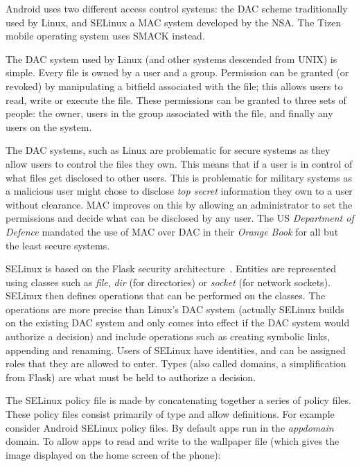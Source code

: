 \documentclass[a4paper,sfsidenotes]{%
  scrartcl%
}
\begin{document}
Android uses two different access control systems: the
\ac{DAC} scheme traditionally used by Linux, and SELinux a \ac{MAC} system
developed by the NSA.  The Tizen mobile
operating system uses SMACK instead.

The \ac{DAC} system used by Linux (and other systems descended from UNIX) is
simple.  Every file is owned by a user and a group.  Permission can be granted
(or revoked) by manipulating a bitfield associated with the file; this allows
users to read, write or execute the file.  These permissions can be granted to
three sets of people: the owner, users in the group associated with the file,
and finally any users on the system.

The \ac{DAC} systems, such as Linux are problematic for secure systems as they
allow users to control the files they own.  This means that if a user is in
control of what files get disclosed to other users.  This is problematic for
military systems as a malicious user might chose to disclose \emph{top secret}
information they own to a user without clearance.  \ac{MAC} improves on this by
allowing an administrator to set the permissions and decide what can be
disclosed by any user.  The US \emph{Department of Defence} mandated the use of
\ac{MAC} over \ac{DAC} in their \emph{Orange Book}\cite{LiliQiu:1985wq} for all but
the least secure systems.

SELinux is based on the Flask security architecture~\cite{Spencer:1999vm}.
Entities are represented using classes such as \emph{file}, \emph{dir} (for
directories) or \emph{socket} (for network sockets).  SELinux then defines
operations that can be performed on the classes.  The operations are more
precise than Linux's \ac{DAC} system (actually SELinux builds on the existing
\ac{DAC} system and only comes into effect if the \ac{DAC} system would
authorize a decision) and include operations such as creating symbolic links,
appending and renaming.  Users of SELinux have identities, and can be assigned
roles that they are allowed to enter.  Types (also called domains, a
simplification from Flask) are what must be held to authorize a decision.  

The SELinux policy file is made by concatenating together a series of policy
files.  These policy files consist primarily of type and allow definitions.
For example consider Android SELinux policy files.  By default apps run in
the \emph{appdomain} domain.  To allow apps to read and write to the wallpaper
file (which gives the image displayed on the home screen of the phone):
\end{document}
